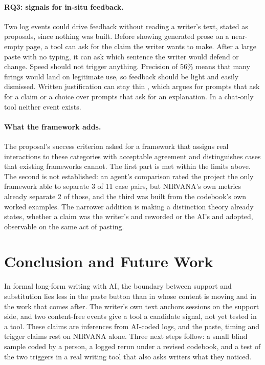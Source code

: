 \documentclass[manuscript,screen]{acmart}
\begin{document}
\paragraph{RQ3: signals for in-situ feedback.} Two log events could drive feedback without reading a writer's text, stated as proposals, since nothing was built. Before showing generated prose on a near-empty page, a tool can ask for the claim the writer wants to make. After a large paste with no typing, it can ask which sentence the writer would defend or change. Speed should not trigger anything. Precision of 56\% means that many firings would land on legitimate use, so feedback should be light and easily dismissed. Written justification can stay thin \cite{tao2026}, which argues for prompts that ask for a claim or a choice over prompts that ask for an explanation. In a chat-only tool neither event exists.

\paragraph{What the framework adds.} The proposal's success criterion asked for a framework that assigns real interactions to these categories with acceptable agreement and distinguishes cases that existing frameworks cannot. The first part is met within the limits above. The second is not established: an agent's comparison rated the project the only framework able to separate 3 of 11 case pairs, but NIRVANA's own metrics already separate 2 of those, and the third was built from the codebook's own worked examples. The narrower addition is making a distinction theory already states, whether a claim was the writer's and reworded or the AI's and adopted, observable on the same act of pasting.

\section{Conclusion and Future Work}
\label{sec:conclusion}

In formal long-form writing with AI, the boundary between support and substitution lies less in the paste button than in whose content is moving and in the work that comes after. The writer's own text anchors sessions on the support side, and two content-free events give a tool a candidate signal, not yet tested in a tool. These claims are inferences from AI-coded logs, and the paste, timing and trigger claims rest on NIRVANA alone. Three next steps follow: a small blind sample coded by a person, a logged rerun under a revised codebook, and a test of the two triggers in a real writing tool that also asks writers what they noticed.
\end{document}
